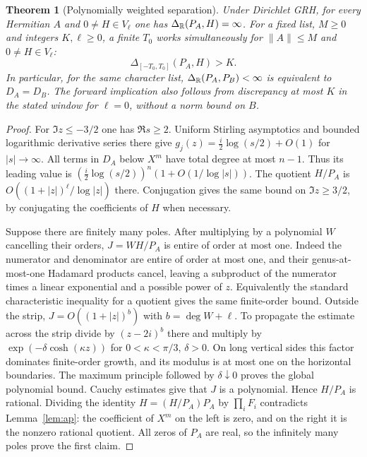 \documentclass[11pt]{article}
\newtheorem{theorem}{Theorem}[section]
\theoremstyle{remark}\newtheorem{remark}[theorem]{Remark}
\begin{document}
\begin{theorem}[Polynomially weighted separation]\label{thm:window}
Under Dirichlet GRH, for every Hermitian $A$ and $0\ne H\in V_\ell$ one has $\Delta_\mathbb R(P_A,H)=\infty$. For a fixed list, $M\ge0$ and integers $K,\ell\ge0$, a finite $T_0$ works simultaneously for $\|A\|\le M$ and $0\ne H\in V_\ell$:
\[
 \Delta_{[-T_0,T_0]}(P_A,H)>K .
\]
In particular, for the same character list, $\Delta_\mathbb R(P_A,P_B)<\infty$ is equivalent to $D_A=D_B$. The forward implication also follows from discrepancy at most $K$ in the stated window for $\ell=0$, without a norm bound on $B$.
\end{theorem}
\begin{proof}
For $\Im z\le-3/2$ one has $\Re s\ge2$. Uniform Stirling asymptotics and bounded logarithmic derivative series there give $g_j(z)=\tfrac i2\log(s/2)+O(1)$ for $|s|\to\infty$. All terms in $D_A$ below $X^m$ have total degree at most $n-1$. Thus its leading value is $(\tfrac i2\log(s/2))^n(1+O(1/\log |s|))$. The quotient $H/P_A$ is $O((1+|z|)^\ell/\log |z|)$ there. Conjugation gives the same bound on $\Im z\ge3/2$, by conjugating the coefficients of $H$ when necessary.

Suppose there are finitely many poles. After multiplying by a polynomial $W$ cancelling their orders, $J=WH/P_A$ is entire of order at most one. Indeed the numerator and denominator are entire of order at most one, and their genus-at-most-one Hadamard products cancel, leaving a subproduct of the numerator times a linear exponential and a possible power of $z$. Equivalently the standard characteristic inequality for a quotient gives the same finite-order bound. Outside the strip, $J=O((1+|z|)^b)$ with $b=\deg W+\ell$. To propagate the estimate across the strip divide by $(z-2i)^b$ there and multiply by $\exp(-\delta\cosh(\kappa z))$ for $0<\kappa<\pi/3$, $\delta>0$. On long vertical sides this factor dominates finite-order growth, and its modulus is at most one on the horizontal boundaries. The maximum principle followed by $\delta\downarrow0$ proves the global polynomial bound. Cauchy estimates give that $J$ is a polynomial. Hence $H/P_A$ is rational. Dividing the identity $H=(H/P_A)P_A$ by $\prod_i F_i$ contradicts Lemma~\ref{lem:ap}: the coefficient of $X^m$ on the left is zero, and on the right it is the nonzero rational quotient. All zeros of $P_A$ are real, so the infinitely many poles prove the first claim.


\end{proof}
\end{document}
